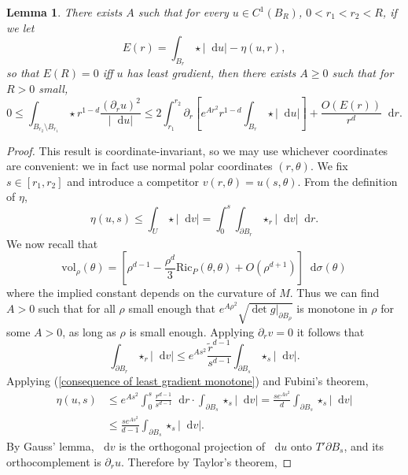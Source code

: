 \documentclass[final,12pt, leqno]{brownthesis}
\newcommand{\Ric}{\mathrm{Ric}}
\newcommand*\dif{\mathop{}\!\mathrm{d}}
\newcommand{\vol}{\mathrm{vol}}
\newtheorem{lemma}[theorem]{Lemma}
\theoremstyle{definition}
\numberwithin{equation}{section}
\begin{document}
\begin{lemma}\label{monotonicity lemma}
There exists $A$ such that for every $u \in C^1(B_R)$, $0 < r_1 < r_2 < R$, if we let
$$E(r) = \int_{B_r} \star |\dif u| - \eta(u, r),$$
so that $E(R) = 0$ iff $u$ has least gradient, then there exists $A \geq 0$ such that for $R > 0$ small,
\begin{equation}\label{monotonicity lemma eqn}
0 \leq \int_{B_{r_2} \setminus B_{r_1}} \star r^{1 - d}\frac{(\partial_ru)^2}{|\dif u|} \leq 2\int_{r_1}^{r_2} \partial_r \left[e^{Ar^2} r^{1-d}\int_{B_r} \star |\dif u|\right] + \frac{O(E(r))}{r^d} \dif r.
\end{equation}
\end{lemma}
\begin{proof}
This result is coordinate-invariant, so we may use whichever coordinates are convenient: we in fact use normal polar coordinates $(r, \theta)$.
We fix $s \in [r_1, r_2]$ and introduce a competitor $v(r, \theta) = u(s, \theta)$.
From the definition of $\eta$,
\begin{equation}\label{consequence of least gradient monotone}
    \eta(u, s) \leq \int_U \star |\dif v| = \int_0^s \int_{\partial B_r} \star_r |\dif v| \dif r.
\end{equation}
We now recall that
$$\vol_\rho(\theta) = \left[\rho^{d - 1} - \frac{\rho^d}{3} \Ric_P(\theta, \theta) + O(\rho^{d + 1})\right] \dif \sigma(\theta)$$
where the implied constant depends on the curvature of $M$.
Thus we can find $A > 0$ such that for all $\rho$ small enough that $e^{A\rho^2} \sqrt{\det g|_{\partial B_\rho}}$ is monotone in $\rho$ for some $A > 0$, as long as $\rho$ is small enough.
Applying $\partial_r v = 0$ it follows that
\begin{equation}\label{introduce the ricci tensor}
\int_{\partial B_r} \star_r |\dif v| \leq e^{As^2} \frac{\tilde r^{d - 1}}{s^{d - 1}} \int_{\partial B_s} \star_s |\dif v|.
\end{equation}
Applying (\ref{consequence of least gradient monotone}) and Fubini's theorem,
\begin{align*}
\eta(u, s) &\leq e^{As^2} \int_0^s \frac{r^{d - 1}}{s^{d - 1}} \dif r \cdot \int_{\partial B_s} \star_s |\dif v| = \frac{s e^{As^2}}{d} \int_{\partial B_s} \star_s |\dif v|\\
&\leq \frac{s e^{As^2}}{d - 1} \int_{\partial B_s} \star_s |\dif v|.
\end{align*}
By Gauss' lemma, $\dif v$ is the orthogonal projection of $\dif u$ onto $T' \partial B_s$, and its orthocomplement is $\partial_r u$. Therefore by Taylor's theorem,

\end{proof}
\end{document}
